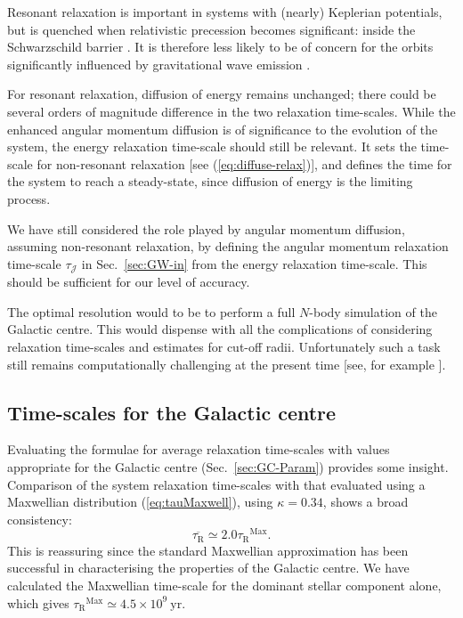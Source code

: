 \documentclass[useAMS,usedcolumn,usegraphicx,usenatbib]{mn2e}
\newcommand{\eqnref}[1]{(\ref{eq:#1})}
\newcommand{\secref}[1]{Sec.~\ref{sec:#1}}
\newcommand{\units}[1]{\ensuremath{~\mathrm{#1}}}
\newcommand{\sub}[1]{\ensuremath{_\mathrm{#1}}}
\newcommand{\super}[1]{\ensuremath{^\mathrm{#1}}}
\begin{document}
\begin{onecolumn}
Resonant relaxation is important in systems with (nearly) Keplerian potentials, but is quenched when relativistic precession becomes significant: inside the Schwarzschild barrier \citep{Merritt2011}. It is therefore less likely to be of concern for the orbits significantly influenced by gravitational wave emission \citep{Sigurdsson1997}.

For resonant relaxation, diffusion of energy remains unchanged; there could be several orders of magnitude difference in the two relaxation time-scales. While the enhanced angular momentum diffusion is of significance to the evolution of the system, the energy relaxation time-scale should still be relevant. It sets the time-scale for non-resonant relaxation [see \eqnref{diffuse-relax}], and defines the time for the system to reach a steady-state, since diffusion of energy is the limiting process.

We have still considered the role played by angular momentum diffusion, assuming non-resonant relaxation, by defining the angular momentum relaxation time-scale $\tau_\mathcal{J}$ in \secref{GW-in} from the energy relaxation time-scale. This should be sufficient for our level of accuracy.

The optimal resolution would to be to perform a full $N$-body simulation of the Galactic centre. This would dispense with all the complications of considering relaxation time-scales and estimates for cut-off radii. Unfortunately such a task still remains computationally challenging at the present time [see, for example \citet{Li2012}].

\subsection{Time-scales for the Galactic centre}\label{sec:tauGC}

Evaluating the formulae for average relaxation time-scales with values appropriate for the Galactic centre (\secref{GC-Param}) provides some insight. Comparison of the system relaxation time-scales with that evaluated using a Maxwellian distribution \eqnref{tauMaxwell}, using $\kappa = 0.34$, shows a broad consistency:
\begin{equation}
\overline{\tau\sub{R}} \simeq 2.0 \tau\sub{R}\super{Max}.
\end{equation}
This is reassuring since the standard Maxwellian approximation has been successful in characterising the properties of the Galactic centre. We have calculated the Maxwellian time-scale for the dominant stellar component alone, which gives $\tau\sub{R}\super{Max}\simeq 4.5 \times 10^9\units{yr}$.


\end{onecolumn}
\end{document}
